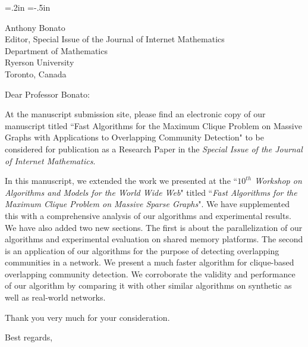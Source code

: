 
\oddsidemargin=0in %
\evensidemargin=.2in
\textwidth=6.5in
\topmargin=-.5in
\textheight=9in


\date{\today}



\begin{letter}{
Anthony Bonato \\
Editor, Special Issue of the Journal of Internet Mathematics  \\
Department of Mathematics \\
Ryerson University \\
Toronto, Canada
}

\opening{Dear Professor Bonato:}

At the manuscript submission site, please find an electronic copy of our manuscript titled
``Fast Algorithms for the Maximum Clique Problem on Massive Graphs with Applications to Overlapping Community Detection" to be considered for publication as a Research Paper in the 
{\em Special Issue of the Journal of Internet Mathematics}.

In this manuscript, we extended the work we presented at the ``{\em $10^{th}$ Workshop on Algorithms and Models for the World Wide Web}" titled  ``{\em Fast Algorithms for the Maximum Clique Problem on Massive Sparse Graphs}". We have supplemented this with a comprehensive analysis of our algorithms and experimental results. We have also added two new sections. The first is about the parallelization of our algorithms and experimental evaluation on shared memory platforms. The second is an application of our
algorithms for the purpose of detecting overlapping communities in a network. We present a much faster algorithm for clique-based overlapping community detection. We corroborate the validity and performance of our algorithm by comparing it with other similar algorithms on synthetic as well as real-world networks.

Thank you very much for your consideration.

\closing{Best regards,}
\end{letter}





